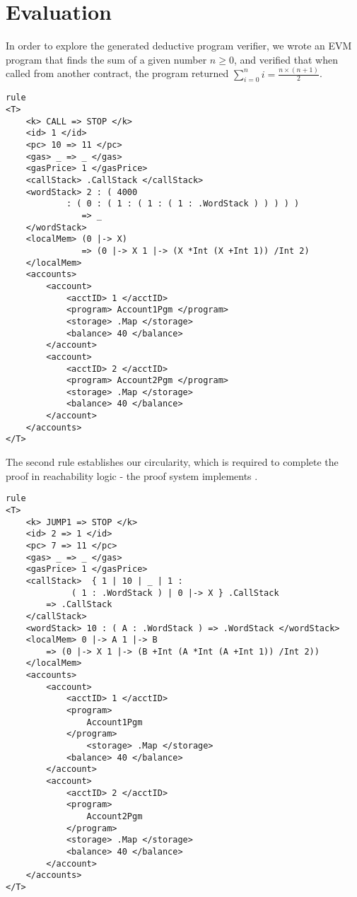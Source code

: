 \section{Evaluation}
In order to explore the generated deductive program verifier, we wrote an EVM
program that finds the sum of a given number $n \geq 0 $, and verified that when called from another contract, the
program returned $ \sum_{i = 0}^{n} i =  \frac{n \times  (n + 1 )}{2}$.

\begin{verbatim}
rule
<T>
    <k> CALL => STOP </k>
    <id> 1 </id>
    <pc> 10 => 11 </pc>
    <gas> _ => _ </gas>
    <gasPrice> 1 </gasPrice>
    <callStack> .CallStack </callStack>
    <wordStack> 2 : ( 4000
            : ( 0 : ( 1 : ( 1 : ( 1 : .WordStack ) ) ) ) )
               => _
    </wordStack>
    <localMem> (0 |-> X)
               => (0 |-> X 1 |-> (X *Int (X +Int 1)) /Int 2)
    </localMem>
    <accounts>
        <account>
            <acctID> 1 </acctID>
            <program> Account1Pgm </program>
            <storage> .Map </storage>
            <balance> 40 </balance>
        </account>
        <account>
            <acctID> 2 </acctID>
            <program> Account2Pgm </program>
            <storage> .Map </storage>
            <balance> 40 </balance>
        </account>
    </accounts>
</T>
\end{verbatim}


The second rule establishes our circularity, which is required to complete the proof in reachability logic - the proof system \K{} implements \cite{stefanescu-park-yuwen-li-rosu-2016-oopsla}.
\begin{verbatim}
rule
<T>
    <k> JUMP1 => STOP </k>
    <id> 2 => 1 </id>
    <pc> 7 => 11 </pc>
    <gas> _ => _ </gas>
    <gasPrice> 1 </gasPrice>
    <callStack>  { 1 | 10 | _ | 1 :
             ( 1 : .WordStack ) | 0 |-> X } .CallStack
        => .CallStack
    </callStack>
    <wordStack> 10 : ( A : .WordStack ) => .WordStack </wordStack>
    <localMem> 0 |-> A 1 |-> B
        => (0 |-> X 1 |-> (B +Int (A *Int (A +Int 1)) /Int 2))
    </localMem>
    <accounts>
        <account>
            <acctID> 1 </acctID>
            <program>
                Account1Pgm
            </program>
                <storage> .Map </storage>
            <balance> 40 </balance>
        </account>
        <account>
            <acctID> 2 </acctID>
            <program>
                Account2Pgm
            </program>
            <storage> .Map </storage>
            <balance> 40 </balance>
        </account>
    </accounts>
</T>

\end{verbatim}

